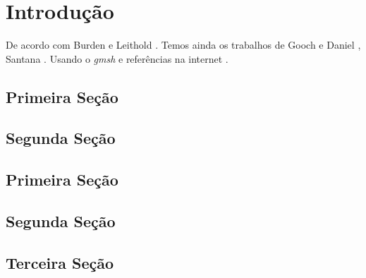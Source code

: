 \chapter{Introdução}

\lipsum[1-2]


De acordo com Burden \cite{burden} e Leithold \cite{leithold}. 
Temos ainda os trabalhos de Gooch e Daniel \cite{gooch,daniel}, 
Santana \cite{santana}. Usando o \emph{gmsh} \cite{gmsh} e 
referências na internet \cite{wiki:quadrature}.

\section{Primeira Seção}

\lipsum[3-4]


\section{Segunda Seção}

\lipsum[5-6]


\section{Primeira Seção}

\lipsum[3-4]


\section{Segunda Seção}

\lipsum[5-6]


\section{Terceira Seção}


